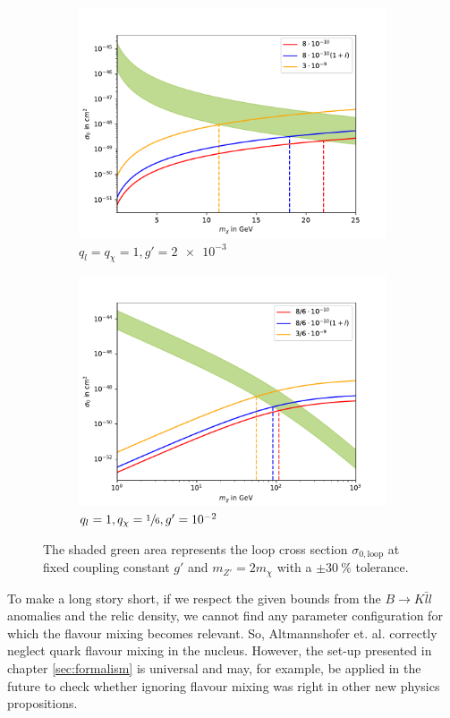 \begin{figure}
	\centering
	\begin{subfigure}[]{0.8\textwidth}
		\includegraphics[width=\textwidth]{content/graphics/Relic11.pdf}
		\caption{$q_l=q_\chi=1,g'=\SI{2e-3}{}$}
		\label{fig:Relic11}
	\end{subfigure}
	\begin{subfigure}[]{0.8\textwidth}
		\includegraphics[width=\textwidth]{content/graphics/Relic116.pdf}
		\caption{$q_l=1,q_\chi=\sfrac{1}{6},g'=\SI{e-2}{}$}
		\label{fig:Relic116}
	\end{subfigure}
	\caption{The shaded green area represents the loop cross section $\sigma_{0,\text{loop}}$ at fixed coupling constant $g'$ and $m_{Z'} = 2m_\chi$ with a $\pm\SI{30}{\%}$ tolerance.}
	\label{fig:Relic}
\end{figure}


To make a long story short, if we respect the given bounds from the $B\rightarrow K\bar{l}l$ anomalies and the relic density, we cannot find any parameter configuration for which the flavour mixing becomes relevant. So, Altmannshofer et. al. correctly neglect quark flavour mixing in the nucleus. However, the set-up presented in chapter \ref{sec:formalism} is universal and may, for example, be applied in the future to check whether ignoring flavour mixing was right in other new physics propositions.